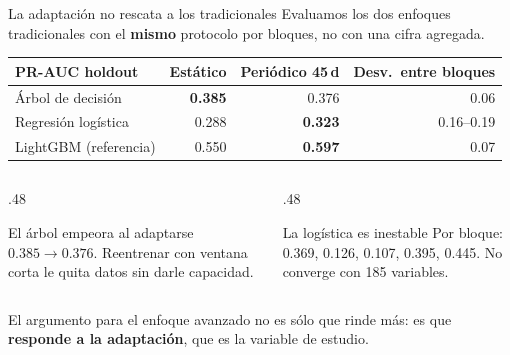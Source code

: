 \documentclass[aspectratio=169,10pt]{beamer}
\begin{document}
\begin{frame}{La adaptación no rescata a los tradicionales}\small
Evaluamos los dos enfoques tradicionales con el \textbf{mismo} protocolo por bloques, no con una cifra agregada.
\begin{center}
\begin{tabular}{@{}lrrr@{}}\toprule
PR-AUC holdout & Estático & Periódico 45\,d & Desv.\ entre bloques\\\midrule
Árbol de decisión & \textbf{0.385} & 0.376 & 0.06\\
Regresión logística & 0.288 & \textbf{0.323} & 0.16--0.19\\\midrule
LightGBM (referencia) & 0.550 & \textbf{0.597} & 0.07\\\bottomrule
\end{tabular}
\end{center}
\vspace{2mm}
\begin{columns}[T]
\begin{column}{.48\linewidth}
\begin{block}{El árbol empeora al adaptarse}
$0.385 \rightarrow 0.376$. Reentrenar con ventana corta le quita datos sin darle capacidad.
\end{block}
\end{column}
\begin{column}{.48\linewidth}
\begin{block}{La logística es inestable}
Por bloque: 0.369, 0.126, 0.107, 0.395, 0.445. No converge con 185 variables.
\end{block}
\end{column}
\end{columns}
\vspace{2mm}
\footnotesize El argumento para el enfoque avanzado no es sólo que rinde más: es que \textbf{responde a la adaptación}, que es la variable de estudio.
\end{frame}
\end{document}
